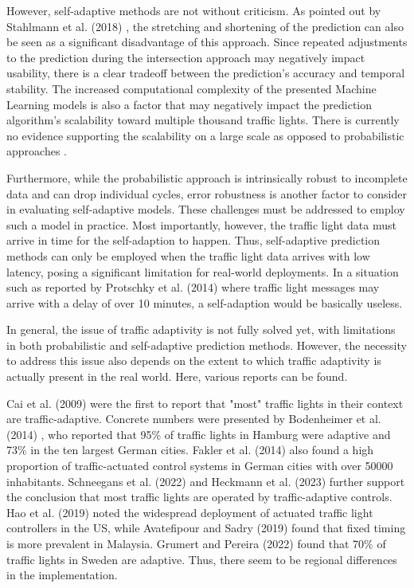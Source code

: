 However, self-adaptive methods are not without criticism. As pointed out by Stahlmann et al. (2018) \cite{stahlmann_exploring_2018}, the stretching and shortening of the prediction can also be seen as a significant disadvantage of this approach. Since repeated adjustments to the prediction during the intersection approach may negatively impact usability, there is a clear tradeoff between the prediction's accuracy and temporal stability. The increased computational complexity of the presented Machine Learning models is also a factor that may negatively impact the prediction algorithm's scalability toward multiple thousand traffic lights. There is currently no evidence supporting the scalability on a large scale as opposed to probabilistic approaches \cite{protschky_extensive_2014, protschky_adaptive_2014}. 

Furthermore, while the probabilistic approach is intrinsically robust to incomplete data and can drop individual cycles, error robustness is another factor to consider in evaluating self-adaptive models. These challenges must be addressed to employ such a model in practice. Most importantly, however, the traffic light data must arrive in time for the self-adaption to happen. Thus, self-adaptive prediction methods can only be employed when the traffic light data arrives with low latency, posing a significant limitation for real-world deployments. In a situation such as reported by Protschky et al. (2014) \cite{protschky_extensive_2014, protschky_adaptive_2014} where traffic light messages may arrive with a delay of over 10 minutes, a self-adaption would be basically useless.

In general, the issue of traffic adaptivity is not fully solved yet, with limitations in both probabilistic and self-adaptive prediction methods. However, the necessity to address this issue also depends on the extent to which traffic adaptivity is actually present in the real world. Here, various reports can be found.

Cai et al. (2009) \cite{cai_adaptive_2009} were the first to report that "most" traffic lights in their context are traffic-adaptive. Concrete numbers were presented by Bodenheimer et al. (2014) \cite{bodenheimer_enabling_2014}, who reported that 95\% of traffic lights in Hamburg were adaptive and 73\% in the ten largest German cities. Fakler et al. (2014) \cite{fakler_structures_2014} also found a high proportion of traffic-actuated control systems in German cities with over 50000 inhabitants. Schneegans et al. (2022) \cite{scheegans_exploiting_2022} and Heckmann et al. (2023) \cite{heckmann_stage_2023} further support the conclusion that most traffic lights are operated by traffic-adaptive controls. Hao et al. (2019) \cite{hao_eco-approach_2019} noted the widespread deployment of actuated traffic light controllers in the US, while Avatefipour and Sadry (2019) \cite{avatefipour_traffic_2018} found that fixed timing is more prevalent in Malaysia. Grumert and Pereira (2022) \cite{grumert_heads-up_2022} found that 70\% of traffic lights in Sweden are adaptive. Thus, there seem to be regional differences in the implementation.

